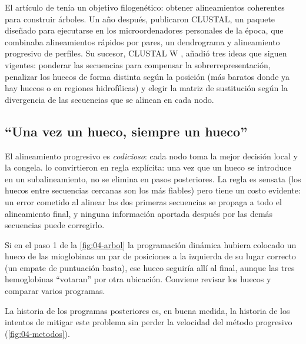 \begin{historia}
El artículo de \textcite{c04-feng1987} tenía un objetivo filogenético: obtener alineamientos coherentes para construir árboles. Un año después, \textcite{c04-higgins1988} publicaron CLUSTAL, un paquete diseñado para ejecutarse en los microordenadores personales de la época, que combinaba alineamientos rápidos por pares, un dendrograma y alineamiento progresivo de perfiles. Su sucesor, CLUSTAL W \parencite{c04-thompson1994}, añadió tres ideas que siguen vigentes: ponderar las secuencias para compensar la sobrerrepresentación, penalizar los huecos de forma distinta según la posición (más baratos donde ya hay huecos o en regiones hidrofílicas) y elegir la matriz de sustitución según la divergencia de las secuencias que se alinean en cada nodo.
\end{historia}

\subsection{``Una vez un hueco, siempre un hueco''}

El alineamiento progresivo es \emph{codicioso}: cada nodo toma la mejor decisión local y la congela. \textcite{c04-feng1987} lo convirtieron en regla explícita: una vez que un hueco se introduce en un subalineamiento, no se elimina en pasos posteriores. La regla es sensata (los huecos entre secuencias cercanas son los más fiables) pero tiene un costo evidente: un error cometido al alinear las dos primeras secuencias se propaga a todo el alineamiento final, y ninguna información aportada después por las demás secuencias puede corregirlo.

\begin{cuidado}
Si en el paso 1 de la \cref{fig:04-arbol} la programación dinámica hubiera colocado un hueco de las mioglobinas un par de posiciones a la izquierda de su lugar correcto (un empate de puntuación basta), ese hueco seguiría allí al final, aunque las tres hemoglobinas ``votaran'' por otra ubicación. Conviene revisar los huecos y comparar varios programas.
\end{cuidado}

La historia de los programas posteriores es, en buena medida, la historia de los intentos de mitigar este problema sin perder la velocidad del método progresivo (\cref{fig:04-metodos}).

